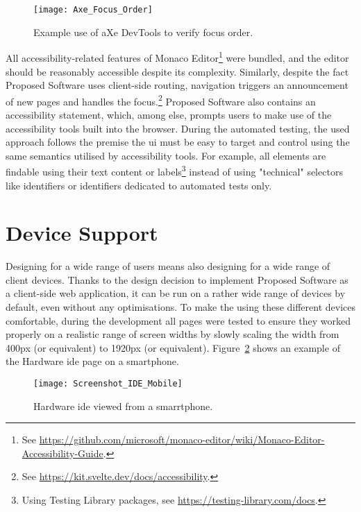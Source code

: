 \begin{figure}[H]
    \centering
    \texttt{[image: Axe\_Focus\_Order]}
    \caption{Example use of aXe DevTools to verify focus order.}
    \label{fig:design-axe-focus}
\end{figure}

All accessibility-related features of Monaco Editor\footnote{See \url{https://github.com/microsoft/monaco-editor/wiki/Monaco-Editor-Accessibility-Guide}.} were bundled, and the editor should be reasonably accessible despite its complexity.
Similarly, despite the fact Proposed Software uses client-side routing, navigation triggers an announcement of new pages and handles the focus.\footnote{See \url{https://kit.svelte.dev/docs/accessibility}.}
Proposed Software also contains an accessibility statement, which, among else, prompts users to make use of the accessibility tools built into the browser.
During the automated testing, the used approach follows the premise the \gls{ui} must be easy to target and control using the same semantics utilised by accessibility tools.
For example, all elements are findable using their text content or labels\footnote{Using Testing Library packages, see \url{https://testing-library.com/docs}.} instead of using "technical" selectors like identifiers or identifiers dedicated to automated tests only.

\section{Device Support}

Designing for a wide range of users means also designing for a wide range of client devices.
Thanks to the design decision to implement Proposed Software as a client-side web application, it can be run on a rather wide range of devices by default, even without any optimisations.
To make the using these different devices comfortable, during the development all pages were tested to ensure they worked properly on a realistic range of screen widths by slowly scaling the width from 400px (or equivalent) to 1920px (or equivalent).
Figure~\ref{fig:design-screenshot-ide-mobile} shows an example of the Hardware \gls{ide} page on a smartphone.

\begin{figure}[H]
    \centering
    \texttt{[image: Screenshot\_IDE\_Mobile]}
    \caption{Hardware \gls{ide} viewed from a smarrtphone.}
    \label{fig:design-screenshot-ide-mobile}
\end{figure}

